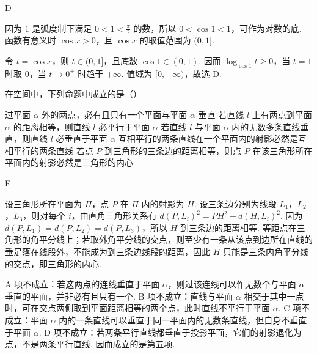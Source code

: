 \begin{answer}
D
\end{answer}

\begin{solution}
因为 \(1\) 是弧度制下满足 \(0<1<\frac{\pi}{2}\) 的数，所以 \(0<\cos1<1\)，可作为对数的底. 函数有意义时 \(\cos x>0\)，且 \(\cos x\) 的取值范围为 \((0,1]\).

令 \(t=\cos x\)，则 \(t\in(0,1]\)，且底数 \(\cos1\in(0,1)\). 因而 \(\log_{\cos1}t\geq0\)，当 \(t=1\) 时取 \(0\)，当 \(t\to0^+\) 时趋于 \(+\infty\). 值域为 \([0,+\infty)\)，故选 D.
\end{solution}

\begin{problem}

在空间中，下列命题中成立的是（\quad）

\choicesfive
    {过平面 \(\alpha \) 外的两点，必有且只有一个平面与平面 \(\alpha \) 垂直}
    {若直线 \(l\) 上有两点到平面 \(\alpha \) 的距离相等，则直线 \(l\) 必平行于平面 \(\alpha \)}
    {若直线 \(l\) 与平面 \(\alpha \) 内的无数多条直线垂直，则直线 \(l\) 必垂直于平面 \(\alpha \)}
    {互相平行的两条直线在一个平面内的射影必然是互相平行的两条直线}
    {若点 \(P\) 到三角形的三条边的距离相等，则点 \(P\) 在该三角形所在平面内的射影必然是三角形的内心}
\end{problem}

\begin{answer}
E
\end{answer}

\begin{solution}
设三角形所在平面为 \(\Pi\)，点 \(P\) 在 \(\Pi\) 内的射影为 \(H\). 设三条边分别为线段 \(L_1\)，\(L_2\)，\(L_3\)，则对每个 \(i\)，由直角三角形关系有 \(d(P,L_i)^2=PH^2+d(H,L_i)^2\). 因为 \(d(P,L_1)=d(P,L_2)=d(P,L_3)\)，所以 \(H\) 到三条边的距离相等. 等距点在三角形的角平分线上；若取外角平分线的交点，则至少有一条从该点到边所在直线的垂足落在线段外，不能成为到三条边线段的距离，因此 \(H\) 只能是三条内角平分线的交点，即三角形的内心.

A 项不成立：若这两点的连线垂直于平面 \(\alpha\)，则过该连线可以作无数个与平面 \(\alpha\) 垂直的平面，并非必有且只有一个. B 项不成立：直线与平面 \(\alpha\) 相交于其中一点时，可在交点两侧取到平面距离相等的两个点，此时直线不平行于平面 \(\alpha\). C 项不成立：平面 \(\alpha\) 内的一条直线可以垂直于同一平面内的无数条直线，但自身不垂直于平面 \(\alpha\). D 项不成立：若两条平行直线都垂直于投影平面，它们的射影退化为点，不是两条平行直线. 因而成立的是第五项.
\end{solution}

